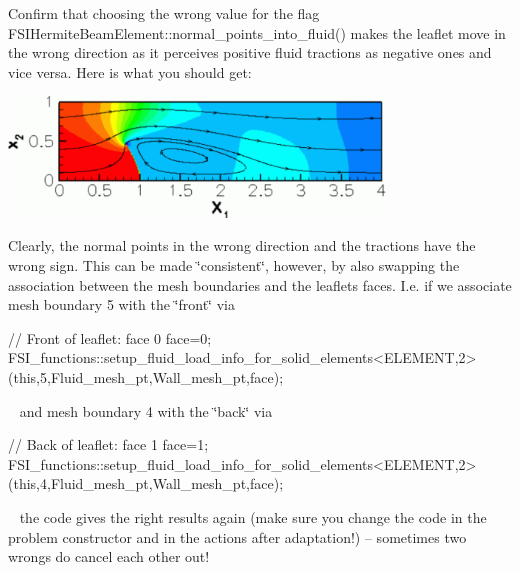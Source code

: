 \begin{DoxyEnumerate}
\item Confirm that choosing the wrong value for the flag {\ttfamily F\+S\+I\+Hermite\+Beam\+Element\+::normal\+\_\+points\+\_\+into\+\_\+fluid()} makes the leaflet move in the wrong direction as it perceives positive fluid tractions as negative ones and vice versa. Here is what you should get\+:  
\begin{DoxyImage}
\includegraphics[width=0.75\textwidth]{normal_points_in_wrong_direction}
\end{DoxyImage}
 Clearly, the normal points in the wrong direction and the tractions have the wrong sign. This can be made \char`\"{}consistent\char`\"{}, however, by also swapping the association between the mesh boundaries and the leaflet\textquotesingle{}s faces. I.\+e. if we associate mesh boundary 5 with the \char`\"{}front\char`\"{} via ~\newline
~\newline

\begin{DoxyCode}
\textcolor{comment}{// Front of leaflet: face 0}
face=0; 
FSI\_functions::setup\_fluid\_load\_info\_for\_solid\_elements<ELEMENT,2>
 (\textcolor{keyword}{this},5,Fluid\_mesh\_pt,Wall\_mesh\_pt,face); 
\end{DoxyCode}
 ~\newline
 and mesh boundary 4 with the \char`\"{}back\char`\"{} via ~\newline
~\newline

\begin{DoxyCode}
\textcolor{comment}{// Back of leaflet: face 1}
face=1; 
FSI\_functions::setup\_fluid\_load\_info\_for\_solid\_elements<ELEMENT,2>
 (\textcolor{keyword}{this},4,Fluid\_mesh\_pt,Wall\_mesh\_pt,face); 
\end{DoxyCode}
 ~\newline
 the code gives the right results again (make sure you change the code in the problem constructor and in the actions after adaptation!) -- sometimes two wrongs do cancel each other out! ~\newline
~\newline


\end{DoxyEnumerate}
